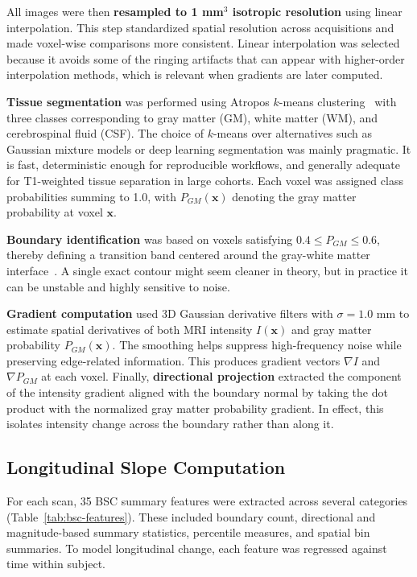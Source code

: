 \documentclass[blue]{ludusofficial}
\begin{document}
All images were then \textbf{resampled to 1 mm$^3$ isotropic resolution} using linear interpolation. This step standardized spatial resolution across acquisitions and made voxel-wise comparisons more consistent. Linear interpolation was selected because it avoids some of the ringing artifacts that can appear with higher-order interpolation methods, which is relevant when gradients are later computed.

\textbf{Tissue segmentation} was performed using Atropos $k$-means clustering~\cite{avants2011atropos} with three classes corresponding to gray matter (GM), white matter (WM), and cerebrospinal fluid (CSF). The choice of $k$-means over alternatives such as Gaussian mixture models or deep learning segmentation was mainly pragmatic. It is fast, deterministic enough for reproducible workflows, and generally adequate for T1-weighted tissue separation in large cohorts. Each voxel was assigned class probabilities summing to 1.0, with $P_{GM}(\mathbf{x})$ denoting the gray matter probability at voxel $\mathbf{x}$.

\textbf{Boundary identification} was based on voxels satisfying $0.4 \leq P_{GM} \leq 0.6$, thereby defining a transition band centered around the gray-white matter interface~\cite{olafson2021bsc}. A single exact contour might seem cleaner in theory, but in practice it can be unstable and highly sensitive to noise. 

\textbf{Gradient computation} used 3D Gaussian derivative filters with $\sigma = 1.0$ mm to estimate spatial derivatives of both MRI intensity $I(\mathbf{x})$ and gray matter probability $P_{GM}(\mathbf{x})$. The smoothing helps suppress high-frequency noise while preserving edge-related information. This produces gradient vectors $\nabla I$ and $\nabla P_{GM}$ at each voxel. Finally, \textbf{directional projection} extracted the component of the intensity gradient aligned with the boundary normal by taking the dot product with the normalized gray matter probability gradient. In effect, this isolates intensity change across the boundary rather than along it.

\subsection{Longitudinal Slope Computation}

For each scan, 35 BSC summary features were extracted across several categories (Table~\ref{tab:bsc-features}). These included boundary count, directional and magnitude-based summary statistics, percentile measures, and spatial bin summaries. To model longitudinal change, each feature was regressed against time within subject.
\end{document}
